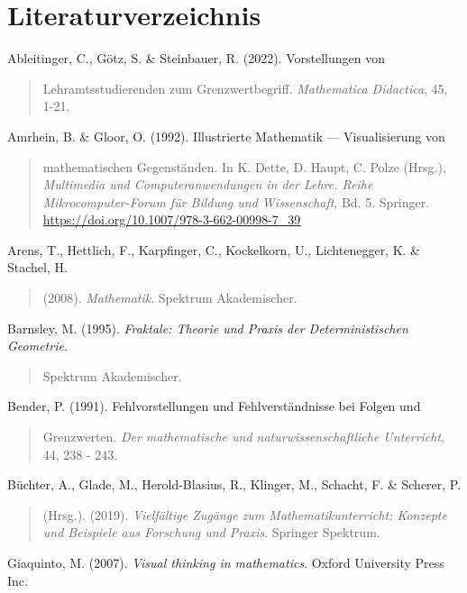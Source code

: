 \documentclass[a4paper, 12pt]{book}
\begin{document}
\chapter{Literaturverzeichnis}\label{literaturverzeichnis}

Ableitinger, C., Götz, S. \& Steinbauer, R. (2022). Vorstellungen von

\begin{quote}
Lehramtsstudierenden zum Grenzwertbegriff. \emph{Mathematica Didactica},
45, 1-21.
\end{quote}

Amrhein, B. \& Gloor, O. (1992). Illustrierte Mathematik ---
Visualisierung von

\begin{quote}
mathematischen Gegenständen. In K. Dette, D. Haupt, C. Polze (Hrsg.),
\emph{Multimedia und Computeranwendungen in der Lehre. Reihe
Mikrocomputer-Forum für Bildung und Wissenschaft}, Bd. 5. Springer.
\url{https://doi.org/10.1007/978-3-662-00998-7_39}
\end{quote}

Arens, T., Hettlich, F., Karpfinger, C., Kockelkorn, U., Lichtenegger,
K. \& Stachel, H.

\begin{quote}
(2008). \emph{Mathematik}. Spektrum Akademischer.
\end{quote}

Barnsley, M. (1995). \emph{Fraktale: Theorie und Praxis der
Deterministischen Geometrie}.

\begin{quote}
Spektrum Akademischer.
\end{quote}

Bender, P. (1991). Fehlvorstellungen und Fehlverständnisse bei Folgen
und

\begin{quote}
Grenzwerten. \emph{Der mathematische und naturwissenschaftliche
Unterricht}, 44, 238 - 243.
\end{quote}

Büchter, A., Glade, M., Herold-Blasius, R., Klinger, M., Schacht, F. \&
Scherer, P.

\begin{quote}
(Hrsg.). (2019). \emph{Vielfältige Zugänge zum Mathematikunterricht:
Konzepte und Beispiele aus Forschung und Praxis}. Springer Spektrum.
\end{quote}

Giaquinto, M. (2007). \emph{Visual thinking in mathematics}. Oxford
University Press Inc.
\end{document}
